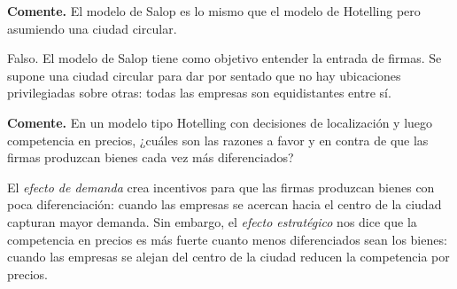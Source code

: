 \question \textbf{Comente.} El modelo de Salop es lo mismo que el modelo de Hotelling pero asumiendo una ciudad circular.
\begin{solution}
Falso. El modelo de Salop tiene como objetivo entender la entrada de firmas. Se supone una ciudad circular para dar por sentado que no hay ubicaciones privilegiadas sobre otras: todas las empresas son equidistantes entre sí.

\end{solution}

\question \textbf{Comente.} En un modelo tipo Hotelling con decisiones de localización y luego competencia en precios, ¿cuáles son las razones a favor y en contra de que las firmas produzcan bienes cada vez más diferenciados?
\begin{solution}
El \emph{efecto de demanda} crea incentivos para que las firmas produzcan bienes con poca diferenciación: cuando las empresas se acercan hacia el centro de la ciudad capturan mayor demanda. Sin embargo, el \emph{efecto estratégico} nos dice que la competencia en precios es más fuerte cuanto menos diferenciados sean los bienes: cuando las empresas se alejan del centro de la ciudad reducen la competencia por precios.

\end{solution}

